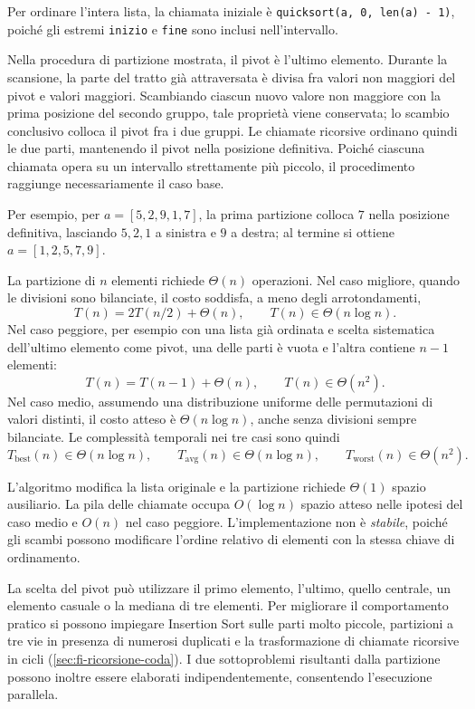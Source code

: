 

Per ordinare l'intera lista, la chiamata iniziale è
\texttt{quicksort(a, 0, len(a) - 1)}, poiché gli estremi
\texttt{inizio} e \texttt{fine} sono inclusi nell'intervallo.

Nella procedura di partizione mostrata, il pivot è l'ultimo elemento.
Durante la scansione, la parte del tratto già attraversata è divisa
fra valori non maggiori del pivot e valori maggiori. Scambiando
ciascun nuovo valore non maggiore con la prima posizione del secondo
gruppo, tale proprietà viene conservata; lo scambio conclusivo
colloca il pivot fra i due gruppi. Le chiamate ricorsive ordinano
quindi le due parti, mantenendo il pivot nella posizione definitiva.
Poiché ciascuna chiamata opera su un intervallo strettamente più
piccolo, il procedimento raggiunge necessariamente il caso base.

Per esempio, per \(a=[5,2,9,1,7]\), la prima partizione colloca
\(7\) nella posizione definitiva, lasciando \(5,2,1\) a sinistra
e \(9\) a destra; al termine si ottiene \(a=[1,2,5,7,9]\).

La partizione di \(n\) elementi richiede \(\Theta(n)\) operazioni.
Nel caso migliore, quando le divisioni sono bilanciate, il costo
soddisfa, a meno degli arrotondamenti,
\[
  T(n)=2T(n/2)+\Theta(n),
  \qquad T(n)\in\Theta(n\log n).
\]
Nel caso peggiore, per esempio con una lista già ordinata e scelta
sistematica dell'ultimo elemento come pivot, una delle parti è vuota
e l'altra contiene \(n-1\) elementi:
\[
  T(n)=T(n-1)+\Theta(n),
  \qquad T(n)\in\Theta(n^2).
\]
Nel caso medio, assumendo una distribuzione uniforme delle
permutazioni di valori distinti, il costo atteso è
\(\Theta(n\log n)\), anche senza divisioni sempre bilanciate.
Le complessità temporali nei tre casi sono quindi
\[
  T_{\mathrm{best}}(n)\in\Theta(n\log n),\qquad
  T_{\mathrm{avg}}(n)\in\Theta(n\log n),\qquad
  T_{\mathrm{worst}}(n)\in\Theta(n^2).
\]

L'algoritmo modifica la lista originale e la partizione richiede
\(\Theta(1)\) spazio ausiliario. La pila delle chiamate occupa
\(O(\log n)\) spazio atteso nelle ipotesi del caso medio e
\(O(n)\) nel caso peggiore. L'implementazione non è \emph{stabile},
poiché gli scambi possono modificare l'ordine relativo di elementi
con la stessa chiave di ordinamento.

La scelta del pivot può utilizzare il primo elemento, l'ultimo,
quello centrale, un elemento casuale o la mediana di tre elementi.
Per migliorare il comportamento pratico si possono impiegare
Insertion Sort sulle parti molto piccole, partizioni a tre vie
in presenza di numerosi duplicati e la trasformazione di chiamate
ricorsive in cicli (\cref{sec:fi-ricorsione-coda}). I due
sottoproblemi risultanti dalla partizione possono inoltre essere
elaborati indipendentemente, consentendo l'esecuzione parallela.

